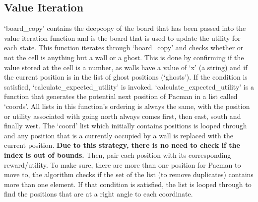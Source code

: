 \documentclass[a4paper]{report}
\begin{document}
      \subsection*{Value Iteration}
        `board\_copy' contains the deepcopy of the board that has been passed into the value iteration function and is the board that is used to update the utility for each state.
        \newline \newline
        This function iterates through `board\_copy' and checks whether or not the cell is anything but a wall or a ghost. This is done by confirming if the value stored at the cell is a number, as walls have a value of `x' (a string) and if the current position is in the list of ghost positions (`ghosts'). If the condition is satisfied, `calculate\_expected\_utility' is invoked.
        \newline \newline
        `calculate\_expected\_utility' is a function that generates the potential next position of Pacman in a list called `coords'. All lists in this function's ordering is always the same, with the position or utility associated with going north always comes first, then east, south and finally west. The `coord' list which initially contains positions is looped through and any position that is a currently occupied by a wall is replaced with the current position. \textbf{Due to this strategy, there is no need to check if the index is out of bounds.} Then, pair each position with its corresponding reward/utility. To make sure, there are more than one position for Pacman to move to, the algorithm checks if the set of the list (to remove duplicates) contains more than one element. If that condition is satisfied, the list is looped through to find the positions that are at a right angle to each coordinate.
\end{document}
